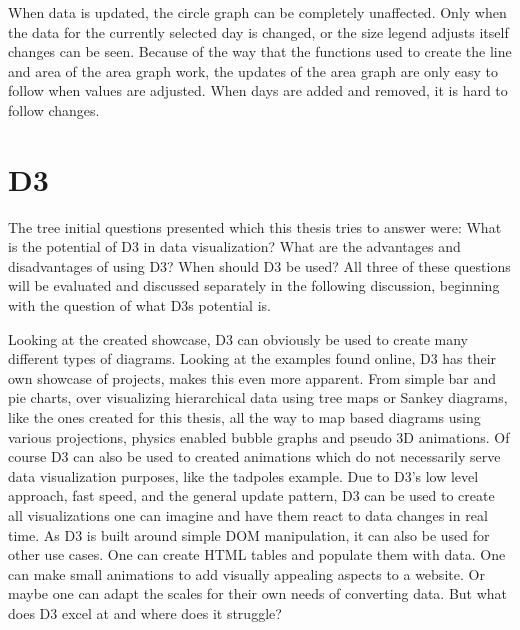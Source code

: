 When data is updated, the circle graph can be completely unaffected. Only when the data for the currently selected day is changed, or the size legend adjusts itself changes can be seen. Because of the way that the functions used to create the line and area of the area graph work, the updates of the area graph are only easy to follow when values are adjusted. When days are added and removed, it is hard to follow changes.


\section{D3}
The tree initial questions presented which this thesis tries to answer were: What is the potential of D3 in data visualization? What are the advantages and disadvantages of using D3? When should D3 be used? All three of these questions will be evaluated and discussed separately in the following discussion, beginning with the question of what D3s potential is. 

Looking at the created showcase, D3 can obviously be used to create many different types of diagrams. Looking at the examples found online, D3 has their own showcase of projects, makes this even more apparent. From simple bar and pie charts, over visualizing hierarchical data using tree maps or Sankey diagrams, like the ones created for this thesis, all the way to map based diagrams using various projections\cite{davies}, physics enabled bubble graphs\cite{carter_2012} and pseudo 3D animations\cite{davies_sphere}. Of course D3 can also be used to created animations which do not necessarily serve data visualization purposes, like the tadpoles example\cite{bostock_2020}. Due to D3's low level approach, fast speed, and the general update pattern, D3 can be used to create all visualizations one can imagine and have them react to data changes in real time. As D3 is built around simple DOM manipulation, it can also be used for other use cases. One can create HTML tables and populate them with data. One can make small animations to add visually appealing aspects to a website. Or maybe one can adapt the scales for their own needs of converting data. But what does D3 excel at and where does it struggle?

